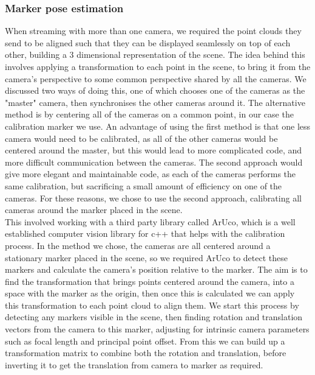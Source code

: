 \documentclass{article}
\begin{document}
\subsubsection{Marker pose estimation}
When streaming with more than one camera, we required the point clouds they send to be aligned such that they can be displayed seamlessly on top of each other, building a 3 dimensional representation of the scene. The idea behind this involves applying a transformation to each point in the scene, to bring it from the camera's perspective to some common perspective shared by all the cameras. We discussed two ways of doing this, one of which chooses one of the cameras as the "master" camera, then synchronises the other cameras around it. The alternative method is by centering all of the cameras on a common point, in our case the calibration marker we use. An advantage of using the first method is that one less camera would need to be calibrated, as all of the other cameras would be centered around the master, but this would lead to more complicated code, and more difficult communication between the cameras. The second approach would give more elegant and maintainable code, as each of the cameras performs the same calibration, but sacrificing a small amount of efficiency on one of the cameras. For these reasons, we chose to use the second approach, calibrating all cameras around the marker placed in the scene.
\\
This involved working with a third party library called ArUco, which is a well established computer vision library for c++ that helps with the calibration process. In the method we chose, the cameras are all centered around a stationary marker placed in the scene, so we required ArUco to detect these markers and calculate the camera's position relative to the marker. The aim is to find the transformation that brings points centered around the camera, into a space with the marker as the origin, then once this is calculated we can apply this transformation to each point cloud to align them. We start this process by detecting any markers visible in the scene, then finding rotation and translation vectors from the camera to this marker, adjusting for intrinsic camera parameters such as focal length and principal point offset. From this we can build up a transformation matrix to combine both the rotation and translation, before inverting it to get the translation from camera to marker as required.
\\
\end{document}
